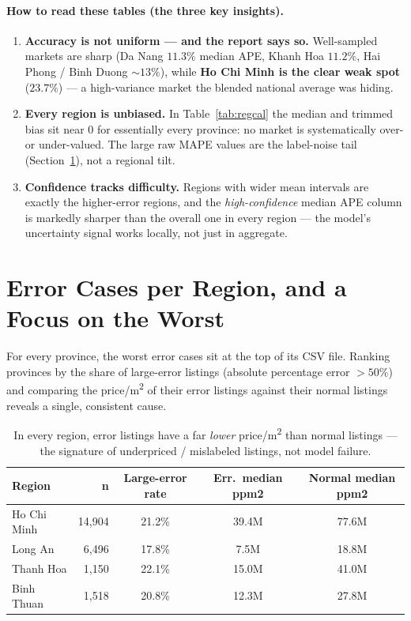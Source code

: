 \documentclass[11pt]{article}
\newcommand{\pct}{\%}
\begin{document}




\paragraph{How to read these tables (the three key insights).}
\begin{enumerate}
  \item \textbf{Accuracy is not uniform --- and the report says so.} Well-sampled markets are sharp
        (Da Nang $11.3\pct$ median APE, Khanh Hoa $11.2\pct$, Hai Phong / Binh Duong $\sim 13\pct$),
        while \textbf{Ho Chi Minh is the clear weak spot} ($23.7\pct$) --- a high-variance market the
        blended national average was hiding.
  \item \textbf{Every region is unbiased.} In Table~\ref{tab:regcal} the median and trimmed bias sit
        near $0$ for essentially every province: no market is systematically over- or under-valued.
        The large raw MAPE values are the label-noise tail (Section~\ref{sec:errors}), not a regional
        tilt.
  \item \textbf{Confidence tracks difficulty.} Regions with wider mean intervals are exactly the
        higher-error regions, and the \emph{high-confidence} median APE column is markedly sharper than
        the overall one in every region --- the model's uncertainty signal works locally, not just in
        aggregate.
\end{enumerate}

\section{Error Cases per Region, and a Focus on the Worst}\label{sec:errors}
For every province, the worst error cases sit at the top of its CSV file. Ranking provinces by the
share of large-error listings (absolute percentage error $>50\pct$) and comparing the price/m\textsuperscript{2}
of their error listings against their normal listings reveals a single, consistent cause.

\begin{table}[h]
\centering
\begin{tabular}{lrccc}
\toprule
\textbf{Region} & \textbf{n} & \textbf{Large-error rate} & \textbf{Err.\ median ppm2} & \textbf{Normal median ppm2} \\
\midrule
Ho Chi Minh & 14,904 & 21.2\pct & 39.4M & 77.6M \\
Long An     &  6,496 & 17.8\pct & 7.5M  & 18.8M \\
Thanh Hoa   &  1,150 & 22.1\pct & 15.0M & 41.0M \\
Binh Thuan  &  1,518 & 20.8\pct & 12.3M & 27.8M \\
\bottomrule
\end{tabular}
\caption{In every region, error listings have a far \emph{lower} price/m\textsuperscript{2} than
normal listings --- the signature of underpriced / mislabeled listings, not model failure.}
\end{table}
\end{document}
